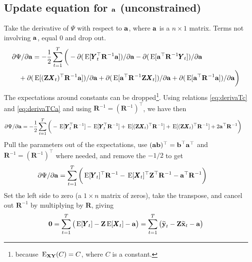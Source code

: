 \documentclass[]{article}
\def\ZZ{\mbox{$\mathbf Z$}}	\def\zz{\mbox{$\mathbf z$}}
\def\RR{\mbox{$\mathbf R$}}	 \def\rr{\mbox{$\mathbf r$}}
\def\XX{\mbox{$\pmb{X}$}}	\def\xx{\mbox{$\pmb{x}$}}
\def\YY{\mbox{$\pmb{Y}$}}	\def\yy{\mbox{$\pmb{y}$}}
\def\E{\,\textup{\textrm{E}}}
\def\EXy{\,\textup{\textrm{E}}_{\text{{\bf XY}}}}
\def\hatxt{\widetilde{\mbox{$\mathbf x$}}_t}
\def\hatyt{\widetilde{\mbox{$\mathbf y$}}_t}
\begin{document}
\subsection{Update equation for $\aa$ (unconstrained)}\label{sec:unconstA}
Take the derivative of $\Psi$ with respect to $\aa$, where $\aa$ is a $n \times 1$ matrix.  Terms not involving $\aa$, equal 0 and drop out.  
\begin{equation}\label{eq:a.unconstrained1}
\begin{split}
&\partial\Psi/\partial\aa = - \frac{1}{2}\sum_{t=1}^T \bigg(- \partial(\E[\YY_t^\top\RR^{-1}\aa])/\partial\aa
- \partial(\E[\aa^\top\RR^{-1}\YY_t])/\partial\aa \\
&\quad + \partial(\E[(\ZZ\XX_t)^\top\RR^{-1}\aa])/\partial\aa 
+ \partial(\E[\aa^\top\RR^{-1}\ZZ\XX_t])/\partial\aa 
+ \partial(\E[\aa^\top\RR^{-1}\aa])/\partial\aa \bigg)
\end{split}
\end{equation}
The expectations around constants can be dropped\footnote{
because $\EXy(C)=C$, where $C$ is a constant.}.  Using relations \eqref{eq:derivaTc} and \eqref{eq:derivaTCa} and using $\RR^{-1} = (\RR^{-1})^\top$, we have then
\begin{equation}\label{eq:a.unconstrained2}
\begin{split}
&\partial\Psi/\partial\aa = - \frac{1}{2}\sum_{t=1}^T\bigg(-\E[\YY_t^\top\RR^{-1}]
-\E[\YY_t^\top\RR^{-1}] + \E[(\ZZ\XX_t)^\top\RR^{-1}] 
  + \E[(\ZZ\XX_t)^\top\RR^{-1}] + 2\aa^\top\RR^{-1} \bigg)
\end{split}
\end{equation}
Pull the parameters out of the expectations, use $(\aa\bb)^\top = \bb^\top\aa^\top$ and $\RR^{-1} = (\RR^{-1})^\top$ where needed, and remove the $-1/2$ to get
\begin{equation}\label{eq:a.unconstrained3}
\begin{split}
&\partial\Psi/\partial\aa = \sum_{t=1}^T\bigg(\E[\YY_t]^\top\RR^{-1}
 - \E[\XX_t]^\top\ZZ^\top\RR^{-1} - \aa^\top\RR^{-1} \bigg)
\end{split}
\end{equation}
Set the left side to zero (a $1 \times n$ matrix of zeros), take the transpose, and cancel out $\RR^{-1}$ by multiplying by $\RR$, giving
\begin{equation}\label{eq:a.unconstrained4}
\mathbf{0} = \sum_{t=1}^{T}\big(\E[\YY_t] - \ZZ\E[\XX_t] - \aa \big)
=\sum_{t=1}^{T}\big(\hatyt - \ZZ\hatxt - \aa\big)
\end{equation}
\end{document}
